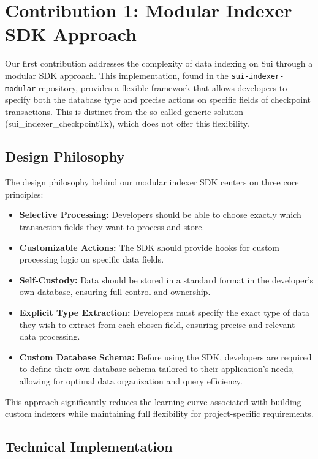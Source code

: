 \section{Contribution 1: Modular Indexer SDK Approach}

Our first contribution addresses the complexity of data indexing on Sui through a modular SDK approach. This implementation, found in the \texttt{sui-indexer-modular} repository, provides a flexible framework that allows developers to specify both the database type and precise actions on specific fields of checkpoint transactions. This is distinct from the so-called generic solution (sui\_indexer\_checkpointTx), which does not offer this flexibility.

\subsection{Design Philosophy}

The design philosophy behind our modular indexer SDK centers on three core principles:

\begin{itemize}
    \item \textbf{Selective Processing:} Developers should be able to choose exactly which transaction fields they want to process and store.
    \item \textbf{Customizable Actions:} The SDK should provide hooks for custom processing logic on specific data fields.
    \item \textbf{Self-Custody:} Data should be stored in a standard format in the developer's own database, ensuring full control and ownership.
    \item \textbf{Explicit Type Extraction:} Developers must specify the exact type of data they wish to extract from each chosen field, ensuring precise and relevant data processing.
    \item \textbf{Custom Database Schema:} Before using the SDK, developers are required to define their own database schema tailored to their application's needs, allowing for optimal data organization and query efficiency.
\end{itemize}

This approach significantly reduces the learning curve associated with building custom indexers while maintaining full flexibility for project-specific requirements.

\subsection{Technical Implementation}

